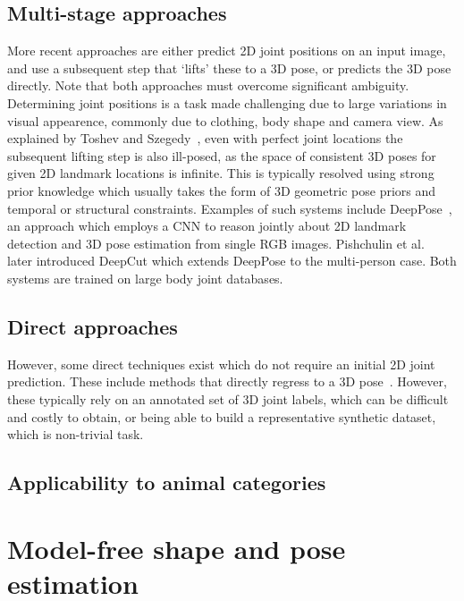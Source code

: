     \subsection{Multi-stage approaches}
    More recent approaches are either predict 2D joint positions on an input image, and use a subsequent step that `lifts' these to a 3D pose, or predicts the 3D pose directly. Note that both approaches must overcome significant ambiguity. Determining joint positions is a task made challenging due to large variations in visual appearence, commonly due to clothing, body shape and camera view. As explained by Toshev and Szegedy~\cite{toshev2014deeppose}, even with perfect joint locations the subsequent lifting step is also ill-posed, as the space of consistent 3D poses for given 2D landmark locations is infinite. This is typically resolved using strong prior knowledge which usually takes the form of 3D geometric pose priors and temporal or structural constraints. Examples of such systems include DeepPose~\cite{toshev2014deeppose}, an approach which employs a CNN to reason jointly about 2D landmark detection and 3D pose estimation from single RGB images. Pishchulin et al.~\cite{pishchulin2016deepcut} later introduced DeepCut which extends DeepPose to the multi-person case. Both systems are trained on large body joint databases. 

    \subsection{Direct approaches}
    However, some direct techniques exist which do not require an initial 2D joint prediction. These include methods that directly regress to a 3D pose~\cite{tekin2016direct}. However, these typically rely on an annotated set of 3D joint labels, which can be difficult and costly to obtain, or being able to build a representative synthetic dataset, which is non-trivial task.


    \subsection{Applicability to animal categories}

\section{Model-free shape and pose estimation}

